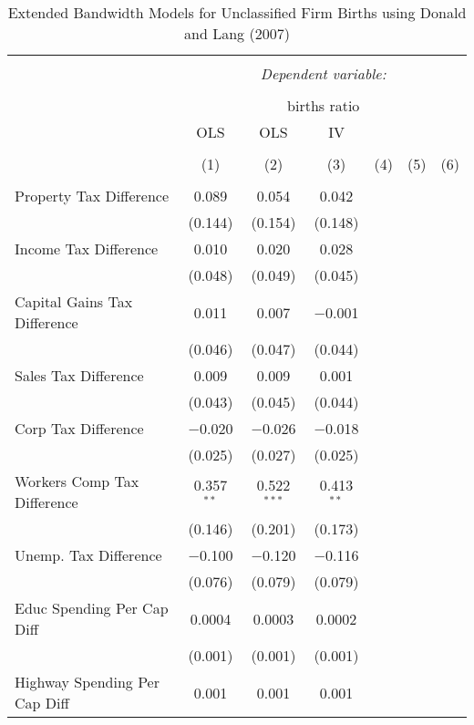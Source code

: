 
\begin{table}[!htbp] \centering 
  \caption{Extended Bandwidth Models for  Unclassified Firm Births using Donald and Lang (2007)} 
  \label{} 
\begin{tabular}{@{\extracolsep{5pt}}lcccccc} 
\\[-1.8ex]\hline 
\hline \\[-1.8ex] 
 & \multicolumn{6}{c}{\textit{Dependent variable:}} \\ 
\cline{2-7} 
\\[-1.8ex] & \multicolumn{6}{c}{births ratio} \\ 
 & OLS & OLS & IV &  &  &  \\ 
\\[-1.8ex] & (1) & (2) & (3) & (4) & (5) & (6)\\ 
\hline \\[-1.8ex] 
 Property Tax Difference & 0.089 & 0.054 & 0.042 &  &  &  \\ 
  & (0.144) & (0.154) & (0.148) &  &  &  \\ 
  Income Tax Difference & 0.010 & 0.020 & 0.028 &  &  &  \\ 
  & (0.048) & (0.049) & (0.045) &  &  &  \\ 
  Capital Gains Tax Difference & 0.011 & 0.007 & $-$0.001 &  &  &  \\ 
  & (0.046) & (0.047) & (0.044) &  &  &  \\ 
  Sales Tax Difference & 0.009 & 0.009 & 0.001 &  &  &  \\ 
  & (0.043) & (0.045) & (0.044) &  &  &  \\ 
  Corp Tax Difference & $-$0.020 & $-$0.026 & $-$0.018 &  &  &  \\ 
  & (0.025) & (0.027) & (0.025) &  &  &  \\ 
  Workers Comp Tax Difference & 0.357$^{**}$ & 0.522$^{***}$ & 0.413$^{**}$ &  &  &  \\ 
  & (0.146) & (0.201) & (0.173) &  &  &  \\ 
  Unemp. Tax Difference & $-$0.100 & $-$0.120 & $-$0.116 &  &  &  \\ 
  & (0.076) & (0.079) & (0.079) &  &  &  \\ 
  Educ Spending Per Cap Diff & 0.0004 & 0.0003 & 0.0002 &  &  &  \\ 
  & (0.001) & (0.001) & (0.001) &  &  &  \\ 
  Highway Spending Per Cap Diff & 0.001 & 0.001 & 0.001 &  &  &  \\ 

\end{tabular}
\end{table}
